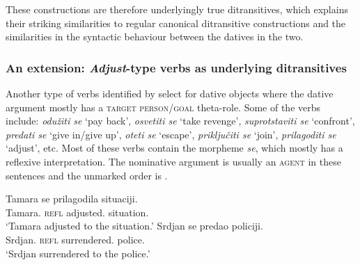 \documentclass[output=paper,
modfonts,
newtxmath,
hidelinks
]{langscibook}
\begin{document}
\noindent These constructions are therefore underlyingly true ditransitives, which explains their striking similarities to regular canonical ditransitive constructions and the similarities in the syntactic behaviour between the datives in the two. 

\subsubsection{An extension: \textit{Adjust}-type verbs as underlying ditransitives}

Another type of verbs identified by \citet[300f.]{stipcevic} select for dative objects where the dative argument mostly has a \textsc{target person/goal} theta-role. Some of the verbs include: \textit{odu\v{z}iti se} `pay back', \textit{osvetiti se} `take revenge', \textit{suprotstaviti se} `confront', \textit{predati se} `give in/give up', \textit{oteti se} `escape', \textit{priključiti se} `join', \textit{prilagoditi se} `adjust', etc. Most of these verbs contain the morpheme \textit{se}, which mostly has a reflexive interpretation. The nominative argument is usually an \textsc{agent} in these sentences and the unmarked order is \nomm{} \before{} \datt{} .

\ea\label{lexicaladjust}
\ea\label{ex29a}\gll Tamara se prilagodila situaciji.\\
Tamara.\nomm{} \textsc{refl} adjusted.\fsg{} situation.\datt\\
\glt `Tamara adjusted to the situation.'
\ex\label{ex29b}\gll Srdjan se predao policiji.\\
Srdjan.\nomm{} \textsc{refl} surrendered.\msg{} police.\datt\\
\glt `Srdjan surrendered to the police.'
\z \z
\end{document}

